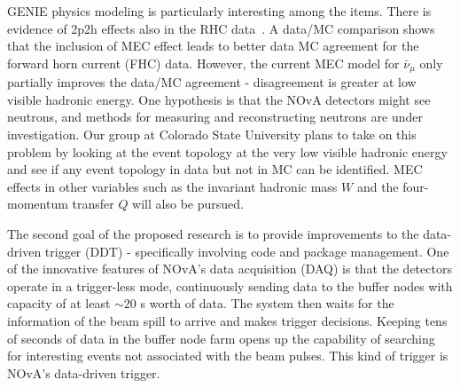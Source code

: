 \documentclass[a4paper, 11pt]{article} %
\begin{document}
GENIE physics modeling is particularly interesting among the items. There is evidence of 2p2h effects also in the RHC data~\cite{Bashar:2016_1}. A data/MC comparison shows that the inclusion of MEC effect leads to better data MC agreement for the forward horn current (FHC) data. However, the current MEC model for $\bar{\nu}_\mu$ only partially improves the data/MC agreement - disagreement is greater at low visible hadronic energy. One hypothesis is that the NOvA detectors might see neutrons, and methods for measuring and reconstructing neutrons are under investigation. Our group at Colorado State University plans to take on this problem by looking at the event topology at the very low visible hadronic energy and see if any event topology in data but not in MC can be identified. MEC effects in other variables such as the invariant hadronic mass $W$ and the four-momentum transfer $Q$ will also be pursued.

The second goal of the proposed research is to provide improvements to the data-driven trigger (DDT) - specifically involving code and package management. One of the innovative features of NOvA's data acquisition (DAQ) is that the detectors operate in a trigger-less mode, continuously sending data to the buffer nodes with capacity of at least $\sim 20$ s worth of data. The system then waits for the information of the beam spill to arrive and makes trigger decisions. Keeping tens of seconds of data in the buffer node farm opens up the capability of searching for interesting events not associated with the beam pulses. This kind of trigger is NOvA's data-driven trigger.
\end{document}
